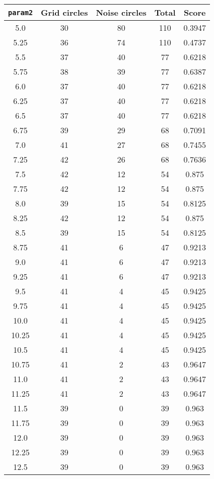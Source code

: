 \documentclass[letterpaper, 12pt]{article}
\begin{document}
\begin{longtable}{|c|c|c|c|c|}
\hline
\textbf{\texttt{param2}} & \textbf{Grid circles} & \textbf{Noise circles} & \textbf{Total} & \textbf{Score} \\
\hline
5.0 & 30 & 80 & 110 & 0.3947 \\
\hline
5.25 & 36 & 74 & 110 & 0.4737 \\
\hline
5.5 & 37 & 40 & 77 & 0.6218 \\
\hline
5.75 & 38 & 39 & 77 & 0.6387 \\
\hline
6.0 & 37 & 40 & 77 & 0.6218 \\
\hline
6.25 & 37 & 40 & 77 & 0.6218 \\
\hline
6.5 & 37 & 40 & 77 & 0.6218 \\
\hline
6.75 & 39 & 29 & 68 & 0.7091 \\
\hline
7.0 & 41 & 27 & 68 & 0.7455 \\
\hline
7.25 & 42 & 26 & 68 & 0.7636 \\
\hline
7.5 & 42 & 12 & 54 & 0.875 \\
\hline
7.75 & 42 & 12 & 54 & 0.875 \\
\hline
8.0 & 39 & 15 & 54 & 0.8125 \\
\hline
8.25 & 42 & 12 & 54 & 0.875 \\
\hline
8.5 & 39 & 15 & 54 & 0.8125 \\
\hline
8.75 & 41 & 6 & 47 & 0.9213 \\
\hline
9.0 & 41 & 6 & 47 & 0.9213 \\
\hline
9.25 & 41 & 6 & 47 & 0.9213 \\
\hline
9.5 & 41 & 4 & 45 & 0.9425 \\
\hline
9.75 & 41 & 4 & 45 & 0.9425 \\
\hline
10.0 & 41 & 4 & 45 & 0.9425 \\
\hline
10.25 & 41 & 4 & 45 & 0.9425 \\
\hline
10.5 & 41 & 4 & 45 & 0.9425 \\
\hline
10.75 & 41 & 2 & 43 & 0.9647 \\
\hline
11.0 & 41 & 2 & 43 & 0.9647 \\
\hline
11.25 & 41 & 2 & 43 & 0.9647 \\
\hline
11.5 & 39 & 0 & 39 & 0.963 \\
\hline
11.75 & 39 & 0 & 39 & 0.963 \\
\hline
12.0 & 39 & 0 & 39 & 0.963 \\
\hline
12.25 & 39 & 0 & 39 & 0.963 \\
\hline
12.5 & 39 & 0 & 39 & 0.963 \\

\end{longtable}
\end{document}
